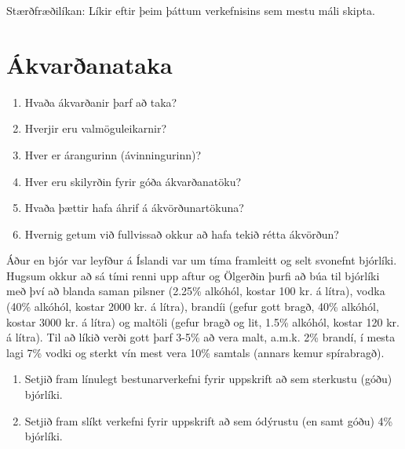 Stærðfræðilíkan: Líkir eftir þeim þáttum verkefnisins sem mestu máli skipta. 

\section{Ákvarðanataka} 
\begin{enumerate} 
\item Hvaða ákvarðanir þarf að taka? 
\item Hverjir eru valmöguleikarnir? 
\item Hver er árangurinn (ávinningurinn)? 
\item Hver eru skilyrðin fyrir góða ákvarðanatöku? 
\item Hvaða þættir hafa áhrif á ákvörðunartökuna? 
\item Hvernig getum við fullvissað okkur að hafa tekið rétta ákvörðun?  
\end{enumerate} 

\begin{daemi}
Áður en bjór var leyfður á Íslandi var um 
tíma framleitt og selt svonefnt bjórlíki. Hugsum okkur að sá 
tími renni upp aftur og Ölgerðin þurfi að búa til bjórlíki með 
því að blanda saman pilsner (2.25\% alkóhól, kostar 100 kr. á 
lítra), vodka (40\% alkóhól, kostar 2000 kr. á lítra), brandíi 
(gefur gott bragð, 40\% alkóhól, kostar 3000 kr. á lítra) og 
maltöli (gefur bragð og lit, 1.5\% alkóhól, kostar 120 kr. á 
lítra). Til að líkið verði gott þarf 3-5\% að vera malt, a.m.k. 
2\% brandí, í mesta lagi 7\% vodki og sterkt vín mest vera 10\% 
samtals (annars kemur spírabragð). 
 
\begin{enumerate} 
\item Setjið fram línulegt bestunarverkefni fyrir uppskrift að 
  sem sterkustu (góðu) bjórlíki. 
\item Setjið fram slíkt verkefni fyrir uppskrift að sem ódýrustu 
  (en samt góðu) 4\% bjórlíki. 
\end{enumerate} 
\end{daemi}

